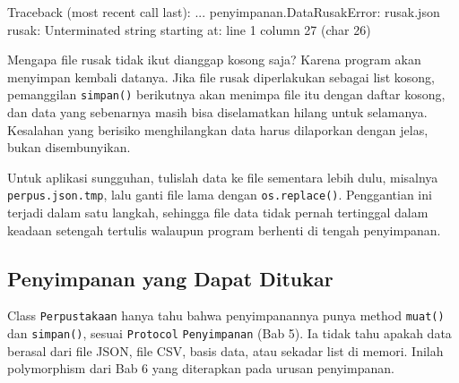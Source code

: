 \begin{keluaran}
Traceback (most recent call last):
  ...
penyimpanan.DataRusakError: rusak.json rusak: Unterminated string starting at: line 1 column 27 (char 26)
\end{keluaran}

Mengapa file rusak tidak ikut dianggap kosong saja? Karena program akan menyimpan kembali datanya. Jika file rusak diperlakukan sebagai list kosong, pemanggilan \texttt{simpan()} berikutnya akan menimpa file itu dengan daftar kosong, dan data yang sebenarnya masih bisa diselamatkan hilang untuk selamanya. Kesalahan yang berisiko menghilangkan data harus dilaporkan dengan jelas, bukan disembunyikan.

\begin{tips}
Untuk aplikasi sungguhan, tulislah data ke file sementara lebih dulu, misalnya \texttt{perpus.json.tmp}, lalu ganti file lama dengan \texttt{os.replace()}. Penggantian ini terjadi dalam satu langkah, sehingga file data tidak pernah tertinggal dalam keadaan setengah tertulis walaupun program berhenti di tengah penyimpanan.
\end{tips}

\subsection{Penyimpanan yang Dapat Ditukar}

Class \texttt{Perpustakaan} hanya tahu bahwa penyimpanannya punya method \texttt{muat()} dan \texttt{simpan()}, sesuai \texttt{Protocol} \texttt{Penyimpanan} (Bab 5). Ia tidak tahu apakah data berasal dari file JSON, file CSV, basis data, atau sekadar list di memori. Inilah polymorphism dari Bab 6 yang diterapkan pada urusan penyimpanan.

